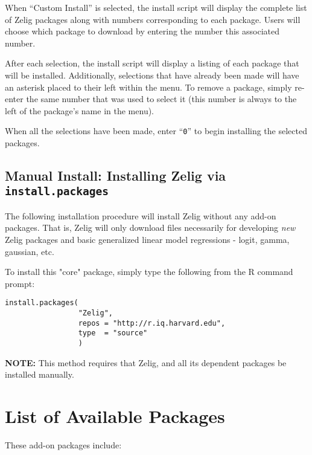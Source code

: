 When ``Custom Install'' is selected, the install script will display the
complete list of Zelig packages along with numbers corresponding to each
package. Users will choose which package to download by entering the number this
associated number.

After each selection, the install script will display a listing of each package
that will be installed. Additionally, selections that have already been made
will have an asterisk placed to their left within the menu. To remove a package,
simply re-enter the same number that was used to select it (this number is
always to the left of the package's name in the menu).

When all the selections have been made, enter ``{\tt 0}'' to begin installing
the selected packages.

\subsection{Manual Install: Installing Zelig via {\tt install.packages}}
\label{subsec:install-manual}

The following installation procedure will install Zelig without any add-on
packages. That is, Zelig will only download files necessarily for developing
\emph{new} Zelig packages and basic generalized linear model regressions -
logit, gamma, gaussian, etc.

To install this "core" package, simply type the following from the R command
prompt:

\begin{verbatim}
install.packages(
                 "Zelig",
                 repos = "http://r.iq.harvard.edu",
                 type  = "source"
                 )
\end{verbatim}

{\noindent}{\bf NOTE: }This method requires that Zelig, and all its dependent
packages be installed manually.


\section{List of Available Packages}
\label{sec:availablepackages}

These add-on packages include:


